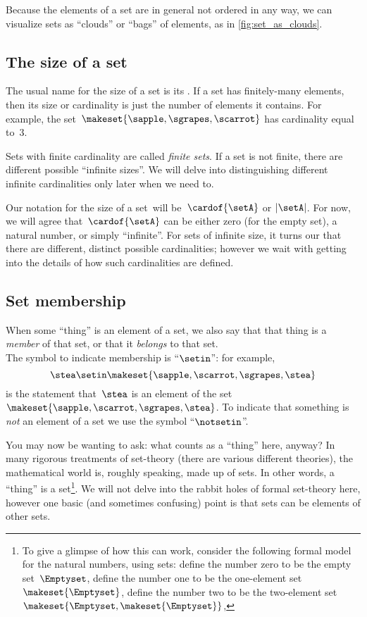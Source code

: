 Because the elements of a set are in general not ordered in any way, we can visualize sets as ``clouds'' or ``bags'' of elements, as in \cref{fig:set_as_clouds}.

\subsection{The size of a set}
\label{sec:cardinality}
The usual name for the size of a set is its .
If a set has finitely-many elements, then its size or cardinality is just the number of elements it contains.
For example, the set~$\makeset{ \sapple, \sgrapes, \scarrot }$ has cardinality equal to~$3$.

Sets with finite cardinality are called \emph{finite sets}.
If a set is not finite, there are different possible ``infinite sizes''.
We will delve into distinguishing different infinite cardinalities only later when we need to.

Our notation for the size of a set~\setA will be~$\cardof{\setA}$ or $\vert \setA \vert$.
For now, we will agree that~$\cardof{\setA}$ can be either zero (for the empty set), a natural number, or simply ``infinite''. For sets of infinite size, it turns our that there are different, distinct possible cardinalities; however we wait with getting into the details of how such cardinalities are defined. 

\subsection{Set membership}
\label{sec:set-membership}
When some ``thing'' is an element of a set, we also say that that thing is a \emph{member} of that set, or that it \emph{belongs} to that set.
\\The symbol to indicate membership is ``$\setin$'': for example,
\begin{equation}
    \stea \setin\makeset{ \sapple, \scarrot, \sgrapes, \stea }
\end{equation}
is the statement that~$\stea$ is an element of the set~$\makeset{ \sapple, \scarrot, \sgrapes, \stea }$.
To indicate that something is \emph{not} an element of a set we use the symbol ``$\notsetin$''.

You may now be wanting to ask: what counts as a ``thing'' here, anyway?
In many rigorous treatments of set-theory (there are various different theories), the mathematical world is, roughly speaking, made up of sets.
In other words, a ``thing'' is a set\footnote{
    To give a glimpse of how this can work, consider the following formal model for the natural numbers, using sets: define the number zero to be the empty set~$\Emptyset$, define the number one to be the one-element set~$\makeset{ \Emptyset }$, define the number two to be the two-element set~$\makeset{ \Emptyset, \makeset{ \Emptyset } }$, \etc }.
We will not delve into the rabbit holes of formal set-theory here, however one basic (and sometimes confusing) point is that sets can be elements of other sets.

